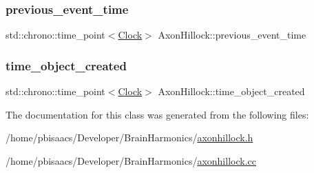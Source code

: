 \subsubsection{\texorpdfstring{previous\+\_\+event\+\_\+time}{previous\_event\_time}}
{\footnotesize\ttfamily std\+::chrono\+::time\+\_\+point$<$\mbox{\hyperlink{universe_8h_a0ef8d951d1ca5ab3cfaf7ab4c7a6fd80}{Clock}}$>$ Axon\+Hillock\+::previous\+\_\+event\+\_\+time\hspace{0.3cm}{\ttfamily [private]}}

\mbox{\label{classAxonHillock_ab8fe082b0aa59b58f6cf8ddb00202ae1}} 
\subsubsection{\texorpdfstring{time\+\_\+object\+\_\+created}{time\_object\_created}}
{\footnotesize\ttfamily std\+::chrono\+::time\+\_\+point$<$\mbox{\hyperlink{universe_8h_a0ef8d951d1ca5ab3cfaf7ab4c7a6fd80}{Clock}}$>$ Axon\+Hillock\+::time\+\_\+object\+\_\+created\hspace{0.3cm}{\ttfamily [private]}}



The documentation for this class was generated from the following files\+:\begin{DoxyCompactItemize}
\item 
/home/pbisaacs/\+Developer/\+Brain\+Harmonics/\mbox{\hyperlink{axonhillock_8h}{axonhillock.\+h}}\item 
/home/pbisaacs/\+Developer/\+Brain\+Harmonics/\mbox{\hyperlink{axonhillock_8cc}{axonhillock.\+cc}}\end{DoxyCompactItemize}
